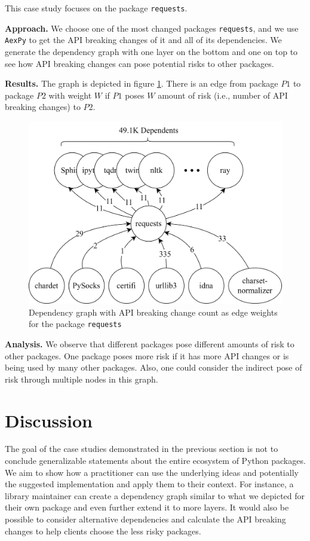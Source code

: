 \documentclass[conference]{IEEEtran}
\begin{document}
This case study focuses on the package \texttt{requests}.

\textbf{Approach.} We choose one of the most changed packages \texttt{requests}, and we use \texttt{AexPy} to get the API breaking changes of it and all of its dependencies. We generate the dependency graph with one layer on the bottom and one on top to see how API breaking changes can pose potential risks to other packages. 

\textbf{Results.} The graph is depicted in figure \ref{fig6}. There is an edge from package $P1$ to package $P2$ with weight $W$ if $P1$ poses $W$ amount of risk (i.e., number of API breaking changes) to $P2$. 

\begin{figure}[h]
\begin{minipage}[h]{\columnwidth}
\centering
  \includegraphics[width=0.8\linewidth]{figs/cs2.png}
  \caption{Dependency graph with API breaking change count as edge weights for the package \texttt{requests}}
  \label{fig6}
\end{minipage}\hfill
\end{figure}

\textbf{Analysis.} We observe that different packages pose different amounts of risk to other packages. One package poses more risk if it has more API changes or is being used by many other packages. Also, one could consider the indirect pose of risk through multiple nodes in this graph. 

\section{Discussion}
The goal of the case studies demonstrated in the previous section is not to conclude generalizable statements about the entire ecosystem of Python packages. We aim to show how a practitioner can use the underlying ideas and potentially the suggested implementation and apply them to their context. For instance, a library maintainer can create a dependency graph similar to what we depicted for their own package and even further extend it to more layers. It would also be possible to consider alternative dependencies and calculate the API breaking changes to help clients choose the less risky packages.
\end{document}
